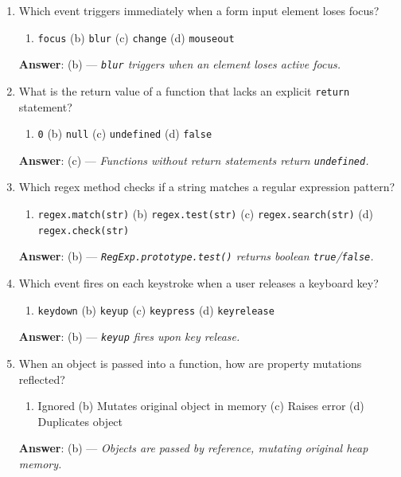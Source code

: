 \begin{enumerate}[leftmargin=1.5em]
    \item Which event triggers immediately when a form input element loses focus?
    \begin{enumerate}[label=(\alph*)]
        \item \texttt{focus} \quad (b) \texttt{blur} \quad (c) \texttt{change} \quad (d) \texttt{mouseout}
    \end{enumerate}
    \textbf{Answer}: (b) --- \textit{\texttt{blur} triggers when an element loses active focus.}

    \item What is the return value of a function that lacks an explicit \texttt{return} statement?
    \begin{enumerate}[label=(\alph*)]
        \item \texttt{0} \quad (b) \texttt{null} \quad (c) \texttt{undefined} \quad (d) \texttt{false}
    \end{enumerate}
    \textbf{Answer}: (c) --- \textit{Functions without return statements return \texttt{undefined}.}

    \item Which regex method checks if a string matches a regular expression pattern?
    \begin{enumerate}[label=(\alph*)]
        \item \texttt{regex.match(str)} \quad (b) \texttt{regex.test(str)} \quad (c) \texttt{regex.search(str)} \quad (d) \texttt{regex.check(str)}
    \end{enumerate}
    \textbf{Answer}: (b) --- \textit{\texttt{RegExp.prototype.test()} returns boolean \texttt{true}/\texttt{false}.}

    \item Which event fires on each keystroke when a user releases a keyboard key?
    \begin{enumerate}[label=(\alph*)]
        \item \texttt{keydown} \quad (b) \texttt{keyup} \quad (c) \texttt{keypress} \quad (d) \texttt{keyrelease}
    \end{enumerate}
    \textbf{Answer}: (b) --- \textit{\texttt{keyup} fires upon key release.}

    \item When an object is passed into a function, how are property mutations reflected?
    \begin{enumerate}[label=(\alph*)]
        \item Ignored \quad (b) Mutates original object in memory \quad (c) Raises error \quad (d) Duplicates object
    \end{enumerate}
    \textbf{Answer}: (b) --- \textit{Objects are passed by reference, mutating original heap memory.}
\end{enumerate}

